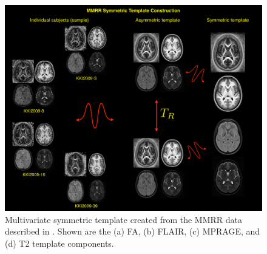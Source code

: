 \documentclass[final,5p,times,twocolumn]{elsarticle}
\begin{document}
\begin{figure}[htb]
  \centering
    \includegraphics[width=150mm]{Figures/templateKirby.pdf}
  \caption{Multivariate symmetric template created from the MMRR 
           data described in \cite{landman2011}.  Shown are the
           (a) FA, (b) FLAIR, (c) MPRAGE, 
           and (d) T2 template components.
          }
  \label{fig:symmetrictemplates}
\end{figure}
\end{document}
